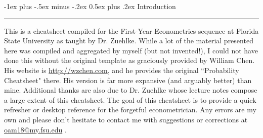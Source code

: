 \documentclass[10pt,landscape]{article}
\makeatletter
\renewcommand{\section}{\@startsection{section}{1}{0mm}%
                                {-1ex plus -.5ex minus -.2ex}%
                                {0.5ex plus .2ex}%
                                {\normalfont\large\bfseries}}
\makeatother
\begin{document}
\raggedright
\footnotesize
\begin{multicols*}{3}

\setlength{\premulticols}{1pt}
\setlength{\postmulticols}{1pt}
\setlength{\multicolsep}{1pt}
\setlength{\columnsep}{2pt}
\setlength{\abovedisplayskip}{2pt}
\setlength{\belowdisplayskip}{2pt}








%



\section{Introduction} \hrule height 2pt 
\scriptsize
This is a cheatsheet compiled for the First-Year Econometrics sequence at Florida State University as taught by Dr. Zuehlke. While a lot of the material presented here was compiled and aggregated by myself (but not invented!), I could not have done this without the original template as graciously provided by William Chen. His website is \url{http://wzchen.com}, and he provides the original ``Probability Cheatsheet" there. His version is far more expansive (and arguably better) than mine. Additional thanks are also due to Dr. Zuehlke whose lecture notes compose a large extent of this cheatsheet. The goal of this cheatsheet is to provide a quick refresher or desktop reference for the forgetful econometrician. Any errors are my own and please don't hesitate to contact me with suggestions or corrections at \url{oam18@my.fsu.edu} .


\end{multicols*}
\end{document}
